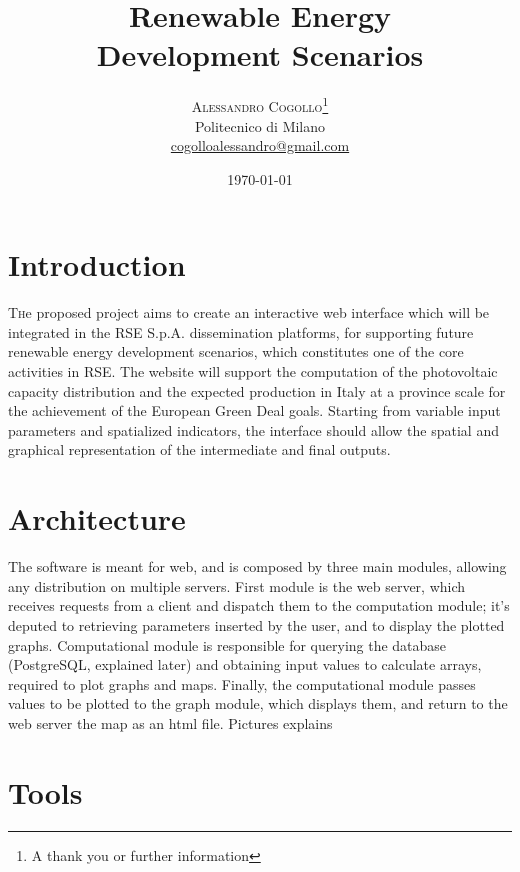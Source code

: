 \documentclass[twoside,twocolumn]{article}
\title{Renewable Energy\\Development Scenarios} %
\author{%
\textsc{Alessandro Cogollo}\thanks{A thank you or further information} \\[1ex] %
\normalsize Politecnico di Milano \\ %
\normalsize \href{mailto:cogolloalessandro@gmail.com}{cogolloalessandro@gmail.com} %
}
\date{\today} %
\begin{document}
\maketitle


\section{Introduction}

\lettrine[nindent=0em,lines=3]{T} he proposed project aims to create an interactive web interface which will be integrated in the RSE S.p.A. dissemination platforms, for supporting future renewable energy development scenarios, which constitutes one of the core activities in RSE.
The website will support the computation of the photovoltaic capacity distribution and the expected production in Italy at a province scale for the achievement of the European Green Deal goals. Starting from variable input parameters and spatialized indicators, the interface should allow the spatial and graphical representation of the intermediate and final outputs. 


\section{Architecture}

The software is meant for web, and is composed by three main modules, allowing any distribution on multiple servers. First module is the web server, which receives requests from a client and dispatch them to the computation module; it's deputed to retrieving parameters inserted by the user, and to display the plotted graphs. Computational module is responsible for querying the database (PostgreSQL, explained later) and obtaining input values to calculate arrays, required to plot graphs and maps. Finally, the computational module passes values to be plotted to the graph module, which displays them, and return to the web server the map as an html file. 
Pictures explains


\section{Tools}
\end{document}
